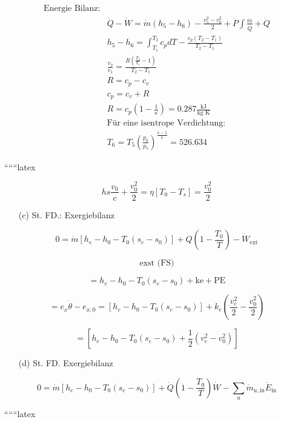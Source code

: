 \begin{align*}
    \text{Energie Bilanz:} \\
    &\dot{Q} - \dot{W} = \dot{m} \left( h_5 - h_6 \right) - \frac{v_5^2 - v_6^2}{2} + \dot{P} \int \frac{\dot{m}}{\dot{Q}} + \dot{Q} \\
    &h_5 - h_6 = \int_{T_1}^{T_2} c_p dT - \frac{c_p \left( T_2 - T_1 \right)}{T_2 - T_1} \\
    &\frac{v_2}{v_1} = \frac{R \left( \frac{T_2}{T_1} - 1 \right)}{T_2 - T_1} \\
    &R = c_p - c_v \\
    &c_p = c_v + R \\
    &R = c_p \left( 1 - \frac{1}{\kappa} \right) = 0.287 \frac{\text{kJ}}{\text{kg K}} \\
    &\text{Für eine isentrope Verdichtung:} \\
    &T_6 = T_5 \left( \frac{p_6}{p_5} \right)^{\frac{\kappa - 1}{\kappa}} = 526.634
\end{align*}

``````latex


\[
hs \frac{v_0}{c} + \frac{v_0^2}{2} = \eta \left[ T_0 - T_s \right] = \frac{v_0^2}{2}
\]

\begin{itemize}
    \item[(c)] St. FD.: Exergiebilanz
\end{itemize}

\[
0 = \dot{m} \left[ h_e - h_0 - T_0 (s_e - s_0) \right] + \dot{Q} \left( 1 - \frac{T_0}{T} \right) - \dot{W}_{\text{ext}}
\]

\[
\text{exst (FS)}
\]

\[
= h_e - h_0 - T_0 (s_e - s_0) + \text{ke} + \text{PE}
\]

\[
= e_x \dot{\theta} - e_{x,0} = \left[ h_e - h_0 - T_0 (s_e - s_0) \right] + k_e \left( \frac{v_e^2}{2} - \frac{v_0^2}{2} \right)
\]

\[
= \left[ h_e - h_0 - T_0 (s_e - s_0) + \frac{1}{2} \left( v_e^2 - v_0^2 \right) \right]
\]

\begin{itemize}
    \item[(d)] St. FD. Exergiebilanz
\end{itemize}

\[
0 = \dot{m} \left[ h_e - h_0 - T_0 (s_e - s_0) \right] + \dot{Q} \left( 1 - \frac{T_0}{T} \right) \dot{W} - \sum_{u} \dot{m}_{u,\text{in}} \dot{E}_{\text{in}}
\]

``````latex


